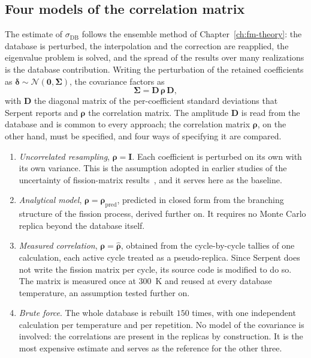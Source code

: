 \subsection{Four models of the correlation matrix}\label{cr:sec:four}

The estimate of $\sigma_{\mathrm{DB}}$ follows the ensemble method of
Chapter~\ref{ch:fm-theory}: the database is perturbed, the interpolation and the
correction are reapplied, the eigenvalue problem is solved, and the spread of
the results over many realizations is the database contribution. Writing the
perturbation of the retained coefficients as
$\boldsymbol\delta\sim\mathcal N(\mathbf 0,\boldsymbol\Sigma)$, the covariance
factors as
%
\begin{equation}
  \boldsymbol\Sigma = \mathbf D\,\boldsymbol\rho\,\mathbf D,
  \label{cr:eq:sigma-factor}
\end{equation}
%
with $\mathbf D$ the diagonal matrix of the per-coefficient standard deviations
that Serpent reports and $\boldsymbol\rho$ the correlation matrix. The
amplitude $\mathbf D$ is read from the database and is common to every
approach; the correlation matrix $\boldsymbol\rho$, on the other hand, must be
specified, and four ways of specifying it are compared.

\begin{enumerate}
  \item \emph{Uncorrelated resampling}, $\boldsymbol\rho=\mathbf I$. Each
  coefficient is perturbed on its own with its own variance. This is the
  assumption adopted in earlier studies of the uncertainty of fission-matrix
  results~\cite{HeWaltersNSE2022}, and it serves here as the baseline.
  \item \emph{Analytical model},
  $\boldsymbol\rho=\boldsymbol\rho_{\mathrm{pred}}$, predicted in closed form
  from the branching structure of the fission process, derived further
  on. It requires no Monte Carlo replica beyond the
  database itself.
  \item \emph{Measured correlation}, $\boldsymbol\rho=\hat{\boldsymbol\rho}$,
  obtained from the cycle-by-cycle tallies of one calculation, each active
  cycle treated as a pseudo-replica. Since Serpent does not write the fission matrix per cycle, its source code is
modified to do so. The matrix is measured once
  at \SI{300}{K} and reused at every database temperature, an assumption tested
  further on.
  \item \emph{Brute force}. The whole database is rebuilt $150$ times, with one independent calculation
per temperature and per repetition. No model of the covariance is involved: the correlations are
  present in the replicas by construction. It is the most expensive estimate
  and serves as the reference for the other three.
\end{enumerate}


